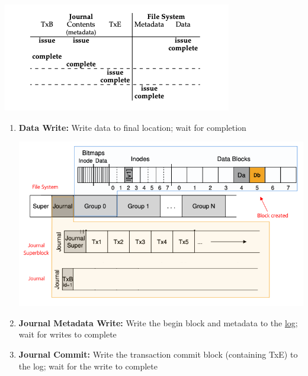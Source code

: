 \documentclass[12pt]{article}
\begin{document}
\begin{enumerate}[1.]
\begin{enumerate}[a)]
\begin{itemize}
\begin{itemize}
                \begin{center}
                \includegraphics[width=0.8\linewidth]{../images/midterm_4_solution_42.png}
                \end{center}

                \begin{enumerate}[1.]
                    \item \textbf{Data Write:} Write data to final location; wait for completion

                    \begin{center}
                    \includegraphics[width=0.8\linewidth]{../images/midterm_4_solution_43.png}
                    \end{center}

                    \item \textbf{Journal Metadata Write:} Write the begin block and metadata to the \underline{log};
                    wait for writes to complete

                    \item \textbf{Journal Commit:} Write the transaction commit block (containing TxE) to
                    the log; wait for the write to complete



\end{enumerate}
\end{itemize}
\end{itemize}
\end{enumerate}
\end{enumerate}
\end{document}
